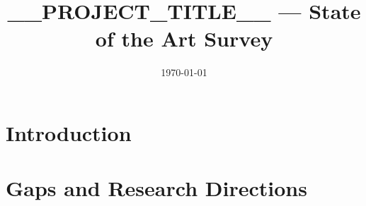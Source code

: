 \documentclass[11pt,a4paper]{article}
\title{__PROJECT_TITLE__ --- State of the Art Survey}
\author{}
\date{\today}
\begin{document}
\maketitle
\tableofcontents
\newpage

\section{Introduction}

\section{Gaps and Research Directions}

\printbibliography
\end{document}

